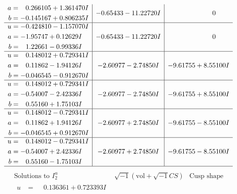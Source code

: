 \documentclass[1p]{elsarticle_modified}
\theoremstyle{definition}
\newcommand{\I}{\sqrt{-1}}
\begin{document}
$$\begin{array}{c|c|c}
\begin{aligned}
a &= \phantom{-}0.266105 + 1.361470 I \\
b &= -0.145167 + 0.806235 I\end{aligned}
 & -0.65433 - 11.22720 I & \phantom{-0.000000 } 0 \\ \hline\begin{aligned}
u &= -0.424810 - 1.157070 I \\
a &= -1.95747 + 0.12629 I \\
b &= \phantom{-}1.22661 - 0.99336 I\end{aligned}
 & -0.65433 - 11.22720 I & \phantom{-0.000000 } 0 \\ \hline\begin{aligned}
u &= \phantom{-}0.148012 + 0.729341 I \\
a &= \phantom{-}0.11862 - 1.94126 I \\
b &= -0.046545 - 0.912670 I\end{aligned}
 & -2.60977 - 2.74850 I & -9.61755 + 8.55100 I \\ \hline\begin{aligned}
u &= \phantom{-}0.148012 + 0.729341 I \\
a &= -0.54007 - 2.42336 I \\
b &= \phantom{-}0.55160 + 1.75103 I\end{aligned}
 & -2.60977 - 2.74850 I & -9.61755 + 8.55100 I \\ \hline\begin{aligned}
u &= \phantom{-}0.148012 - 0.729341 I \\
a &= \phantom{-}0.11862 + 1.94126 I \\
b &= -0.046545 + 0.912670 I\end{aligned}
 & -2.60977 + 2.74850 I & -9.61755 - 8.55100 I \\ \hline\begin{aligned}
u &= \phantom{-}0.148012 - 0.729341 I \\
a &= -0.54007 + 2.42336 I \\
b &= \phantom{-}0.55160 - 1.75103 I\end{aligned}
 & -2.60977 + 2.74850 I & -9.61755 - 8.55100 I\\
 \hline 
 \end{array}$$\newpage$$\begin{array}{c|c|c}  
\text{Solutions to }I^u_{2}& \I (\text{vol} + \sqrt{-1}CS) & \text{Cusp shape}\\
 \hline 
\begin{aligned}
u &= \phantom{-}0.136361 + 0.723393 I \\

\end{aligned}
\end{array}$$
\end{document}
